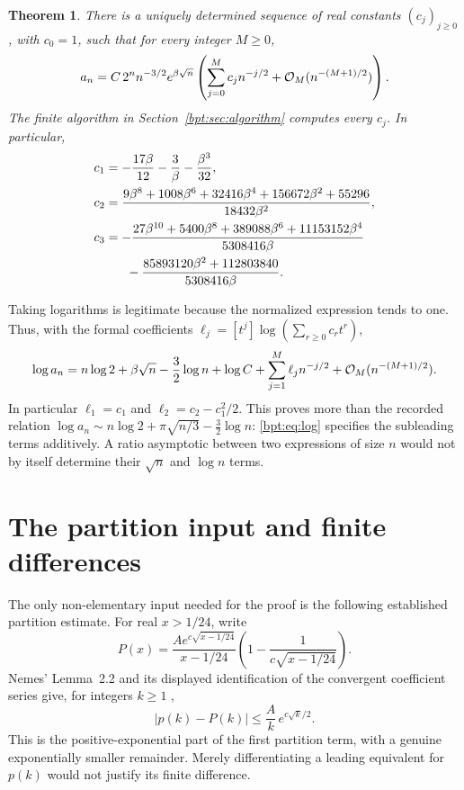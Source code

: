 \documentclass[11pt]{article}
\newtheorem{theorem}{Theorem}[section]
\theoremstyle{remark}\newtheorem{remark}[theorem]{Remark}
\begin{document}
\begin{theorem}\label{bpt:thm:main}
There is a uniquely determined sequence of real constants $(c_j)_{j\ge0}$, with $c_0=1$, such that for every integer $M\ge0$,
\begin{equation}\label{bpt:eq:main}
 a_n=C\,2^n n^{-3/2}e^{\beta\sqrt n}
 \left(\sum_{j=0}^M c_j n^{-j/2}
       +\mathcal O_M(n^{-(M+1)/2})\right).
\end{equation}
The finite algorithm in Section~\ref{bpt:sec:algorithm} computes every $c_j$. In particular,
\begin{align}
 c_1&=-\frac{17\beta}{12}-\frac3\beta-\frac{\beta^3}{32},\label{bpt:eq:c1}\\
 c_2&=\frac{9\beta^8+1008\beta^6+32416\beta^4
                    +156672\beta^2+55296}{18432\beta^2},\label{bpt:eq:c2}\\
 c_3&=-\frac{27\beta^{10}+5400\beta^8+389088\beta^6
                    +11153152\beta^4}{5308416\beta}\notag\\
 &\hspace{1.7em}-\frac{85893120\beta^2+112803840}{5308416\beta}.
 \label{bpt:eq:c3}
\end{align}
\end{theorem}

Taking logarithms is legitimate because the normalized expression tends to one. Thus, with the formal coefficients $\ell_j=[t^j]\log(\sum_{r\ge0}c_rt^r)$,
\begin{equation}\label{bpt:eq:log}
 \log a_n=n\log2+\beta\sqrt n-\frac32\log n+\log C
       +\sum_{j=1}^M\ell_jn^{-j/2}
       +\mathcal O_M(n^{-(M+1)/2}).
\end{equation}
In particular $\ell_1=c_1$ and $\ell_2=c_2-c_1^2/2$. This proves more than the recorded relation
$\log a_n\sim n\log2+\pi\sqrt{n/3}-\tfrac32\log n$:
\eqref{bpt:eq:log} specifies the subleading terms additively. A ratio asymptotic between two expressions of size $n$ would not by itself determine their $\sqrt n$ and $\log n$ terms.

\section{The partition input and finite differences}
The only non-elementary input needed for the proof is the following established partition estimate. For real $x>1/24$, write
\begin{equation}\label{bpt:eq:P}
 P(x)=\frac{A e^{c\sqrt{x-1/24}}}{x-1/24}
       \left(1-\frac1{c\sqrt{x-1/24}}\right).
\end{equation}
Nemes' Lemma~2.2 and its displayed identification of the convergent coefficient series give, for integers $k\ge1$ \cite{nemes},
\begin{equation}\label{bpt:eq:nemes}
 |p(k)-P(k)|\le \frac A{k}\,e^{c\sqrt k/2}.
\end{equation}
This is the positive-exponential part of the first partition term, with a genuine exponentially smaller remainder. Merely differentiating a leading equivalent for $p(k)$ would not justify its finite difference.
\end{document}
